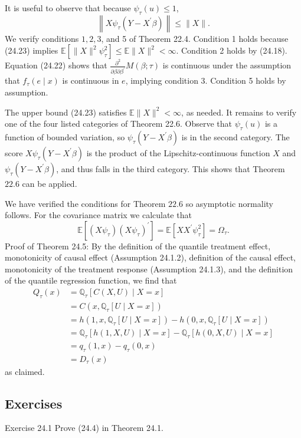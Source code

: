 \documentclass[10pt]{article}
\begin{document}
It is useful to observe that because $\psi_{\tau}(u) \leq 1$,
$$
\left\|X \psi_{\tau}\left(Y-X^{\prime} \beta\right)\right\| \leq\|X\| .
$$
We verify conditions $1,2,3$, and 5 of Theorem 22.4. Condition 1 holds because (24.23) implies $\mathbb{E}\left[\|X\|^{2} \psi_{\tau}^{2}\right] \leq \mathbb{E}\|X\|^{2}<\infty$. Condition 2 holds by (24.18). Equation (24.22) shows that $\frac{\partial^{2}}{\partial \beta \partial \beta^{\prime}} M(\beta ; \tau)$ is continuous under the assumption that $f_{\tau}(e \mid x)$ is continuous in $e$, implying condition 3. Condition 5 holds by assumption.

The upper bound (24.23) satisfies $\mathbb{E}\|X\|^{2}<\infty$, as needed. It remains to verify one of the four listed categories of Theorem 22.6. Observe that $\psi_{\tau}(u)$ is a function of bounded variation, so $\psi_{\tau}\left(Y-X^{\prime} \beta\right)$ is in the second category. The score $X \psi_{\tau}\left(Y-X^{\prime} \beta\right)$ is the product of the Lipschitz-continuous function $X$ and $\psi_{\tau}\left(Y-X^{\prime} \beta\right)$, and thus falls in the third category. This shows that Theorem $22.6$ can be applied.

We have verified the conditions for Theorem $22.6$ so asymptotic normality follows. For the covariance matrix we calculate that
$$
\mathbb{E}\left[\left(X \psi_{\tau}\right)\left(X \psi_{\tau}\right)^{\prime}\right]=\mathbb{E}\left[X X^{\prime} \psi_{\tau}^{2}\right]=\Omega_{\tau} .
$$
Proof of Theorem 24.5: By the definition of the quantile treatment effect, monotonicity of causal effect (Assumption 24.1.2), definition of the causal effect, monotonicity of the treatment response (Assumption 24.1.3), and the definition of the quantile regression function, we find that
$$
\begin{aligned}
Q_{\tau}(x) &=\mathbb{Q}_{\tau}[C(X, U) \mid X=x] \\
&=C\left(x, \mathbb{Q}_{\tau}[U \mid X=x]\right) \\
&=h\left(1, x, \mathbb{Q}_{\tau}[U \mid X=x]\right)-h\left(0, x, \mathbb{Q}_{\tau}[U \mid X=x]\right) \\
&=\mathbb{Q}_{\tau}[h(1, X, U) \mid X=x]-\mathbb{Q}_{\tau}[h(0, X, U) \mid X=x] \\
&=q_{\tau}(1, x)-q_{\tau}(0, x) \\
&=D_{\tau}(x)
\end{aligned}
$$
as claimed.

\subsection{Exercises}
Exercise 24.1 Prove (24.4) in Theorem 24.1.
\end{document}
